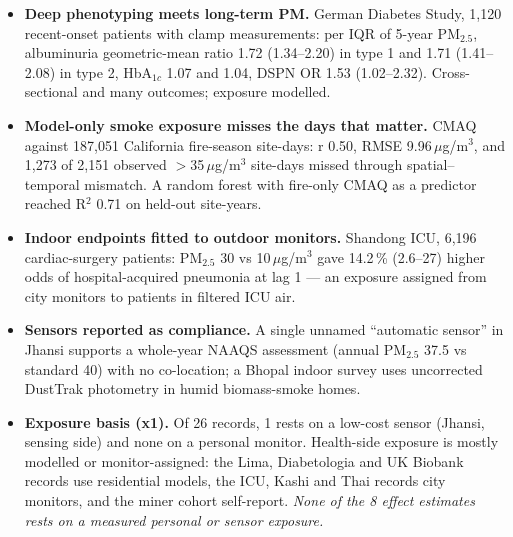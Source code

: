 \documentclass[10pt]{article}
\begin{document}
\footnotesize
\begin{itemize}

\item \textbf{Deep phenotyping meets long-term PM.} German Diabetes Study, 1,120 recent-onset patients with clamp measurements: per IQR of 5-year PM$_{2.5}$, albuminuria geometric-mean ratio 1.72 (1.34--2.20) in type 1 and 1.71 (1.41--2.08) in type 2, HbA$_{1c}$ 1.07 and 1.04, DSPN OR 1.53 (1.02--2.32). Cross-sectional and many outcomes; exposure modelled.

\item \textbf{Model-only smoke exposure misses the days that matter.} CMAQ against 187,051 California fire-season site-days: r 0.50, RMSE 9.96\,$\mu$g/m$^3$, and 1,273 of 2,151 observed $>$35\,$\mu$g/m$^3$ site-days missed through spatial--temporal mismatch. A random forest with fire-only CMAQ as a predictor reached R$^2$ 0.71 on held-out site-years.

\item \textbf{Indoor endpoints fitted to outdoor monitors.} Shandong ICU, 6,196 cardiac-surgery patients: PM$_{2.5}$ 30 vs 10\,$\mu$g/m$^3$ gave 14.2\,\% (2.6--27) higher odds of hospital-acquired pneumonia at lag 1 --- an exposure assigned from city monitors to patients in filtered ICU air.

\item \textbf{Sensors reported as compliance.} A single unnamed ``automatic sensor'' in Jhansi supports a whole-year NAAQS assessment (annual PM$_{2.5}$ 37.5 vs standard 40) with no co-location; a Bhopal indoor survey uses uncorrected DustTrak photometry in humid biomass-smoke homes.

\item \textbf{Exposure basis (x1).} Of 26 records, 1 rests on a low-cost sensor (Jhansi, sensing side) and none on a personal monitor. Health-side exposure is mostly modelled or monitor-assigned: the Lima, Diabetologia and UK Biobank records use residential models, the ICU, Kashi and Thai records city monitors, and the miner cohort self-report. \emph{None of the 8 effect estimates rests on a measured personal or sensor exposure.}

\end{itemize}

\vspace{2mm}
\end{document}
